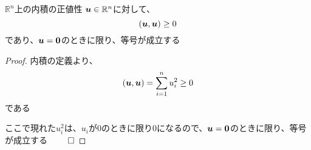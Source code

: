 \documentclass[../../../topic_linear-algebra]{subfiles}
\begin{document}
\br

\begin{theorem}{$\mathbb{R}^n$上の内積の正値性}
  $\vb*{u} \in \mathbb{R}^n$に対して、
  \begin{equation*}
    (\vb*{u}, \vb*{u}) \geq 0
  \end{equation*}
  であり、$\vb*{u} = \vb*{0}$のときに限り、等号が成立する
\end{theorem}

\begin{proof}
  内積の定義より、
  \begin{equation*}
    (\vb*{u}, \vb*{u}) = \sum_{i=1}^n u_i^2 \geq 0
  \end{equation*}
  である

  ここで現れた$u_i^2$は、$u_i$が0のときに限り0になるので、$\vb*{u} = \vb*{0}$のときに限り、等号が成立する $\qed$
\end{proof}
\end{document}

